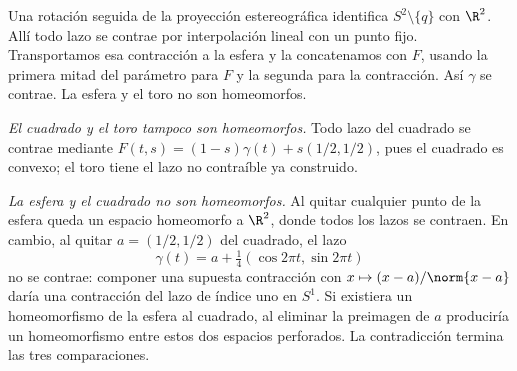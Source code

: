 \begin{solucion}
Una rotación seguida de la proyección estereográfica identifica $S^2\setminus\{q\}$ con $\R^2$. Allí todo lazo se contrae por interpolación lineal con un punto fijo. Transportamos esa contracción a la esfera y la concatenamos con $F$, usando la primera mitad del parámetro para $F$ y la segunda para la contracción. Así $\gamma$ se contrae. La esfera y el toro no son homeomorfos.

\emph{El cuadrado y el toro tampoco son homeomorfos.} Todo lazo del cuadrado se contrae mediante $F(t,s)=(1-s)\gamma(t)+s(1/2,1/2)$, pues el cuadrado es convexo; el toro tiene el lazo no contraíble ya construido.

\emph{La esfera y el cuadrado no son homeomorfos.} Al quitar cualquier punto de la esfera queda un espacio homeomorfo a $\R^2$, donde todos los lazos se contraen. En cambio, al quitar $a=(1/2,1/2)$ del cuadrado, el lazo
\[
\gamma(t)=a+\tfrac14(\cos2\pi t,\sin2\pi t)
\]
no se contrae: componer una supuesta contracción con $x\mapsto(x-a)/\norm{x-a}$ daría una contracción del lazo de índice uno en $S^1$. Si existiera un homeomorfismo de la esfera al cuadrado, al eliminar la preimagen de $a$ produciría un homeomorfismo entre estos dos espacios perforados. La contradicción termina las tres comparaciones.
\end{solucion}

